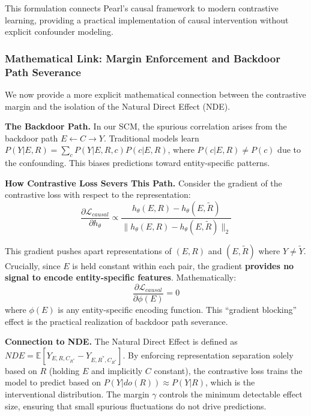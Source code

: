 \documentclass{acmart}
\begin{document}
This formulation connects Pearl's causal framework to modern contrastive learning, providing a practical implementation of causal intervention without explicit confounder modeling.

\subsubsection{Mathematical Link: Margin Enforcement and Backdoor Path Severance}

We now provide a more explicit mathematical connection between the contrastive margin and the isolation of the Natural Direct Effect (NDE).

\textbf{The Backdoor Path.} In our SCM, the spurious correlation arises from the backdoor path $E \leftarrow C \rightarrow Y$. Traditional models learn $P(Y|E,R) = \sum_c P(Y|E,R,c)P(c|E,R)$, where $P(c|E,R) \neq P(c)$ due to the confounding. This biases predictions toward entity-specific patterns.

\textbf{How Contrastive Loss Severs This Path.} Consider the gradient of the contrastive loss with respect to the representation:
\begin{equation}
\frac{\partial \mathcal{L}_{causal}}{\partial h_\theta} \propto \frac{h_\theta(E,R) - h_\theta(E,\tilde{R})}{\|h_\theta(E,R) - h_\theta(E,\tilde{R})\|_2}
\end{equation}

This gradient pushes apart representations of $(E,R)$ and $(E,\tilde{R})$ where $Y \neq \tilde{Y}$. Crucially, since $E$ is held constant within each pair, the gradient \textbf{provides no signal to encode entity-specific features}. Mathematically:
\begin{equation}
\frac{\partial \mathcal{L}_{causal}}{\partial \phi(E)} = 0
\end{equation}
where $\phi(E)$ is any entity-specific encoding function. This ``gradient blocking'' effect is the practical realization of backdoor path severance.

\textbf{Connection to NDE.} The Natural Direct Effect is defined as $NDE = \mathbb{E}[Y_{E,R,C_{R^*}} - Y_{E,R^*,C_{R^*}}]$. By enforcing representation separation solely based on $R$ (holding $E$ and implicitly $C$ constant), the contrastive loss trains the model to predict based on $P(Y|do(R)) \approx P(Y|R)$, which is the interventional distribution. The margin $\gamma$ controls the minimum detectable effect size, ensuring that small spurious fluctuations do not drive predictions.
\end{document}
